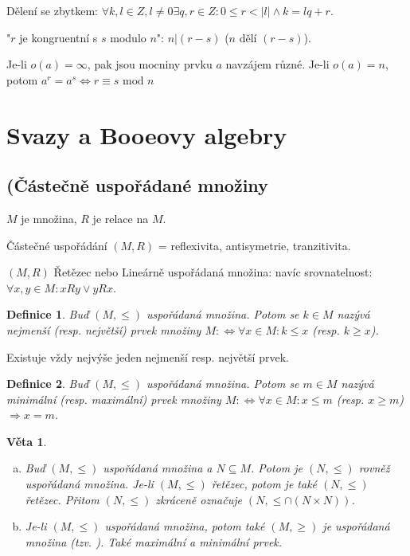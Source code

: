 \documentclass[a4paper, 11pt]{report}
\newtheorem{mydef}{Definice}[chapter]
\newtheorem{veta}{Věta}[chapter]
\begin{document}
Dělení se zbytkem: $\forall k,l \in Z, l \not= 0 \exists q,r \in Z: 0 \leq  r < |l| \land k = lq + r$.

"$r$ je kongruentní s $s$ modulo $n$": $n|(r - s)$ ($n$ dělí $(r-s)$).

Je-li $o(a) = \infty$, pak jsou mocniny prvku $a$ navzájem různé. Je-li $o(a) = n$, potom $a^r = a^s \Leftrightarrow r \equiv s \text{ mod } n$



\section{Svazy a Booeovy algebry}
\subsection{(Částečně uspořádané množiny}

$M$ je množina, $R$ je relace na $M$. 

Částečné uspořádání $(M, R)$ = reflexivita, antisymetrie, tranzitivita.

$(M, R)$ Řetězec nebo Lineárně uspořádaná množina: navíc srovnatelnost: $\forall x,y \in M: xRy \lor yRx$.

\begin{mydef}
Buď $(M, \leq)$ uspořádaná množina. Potom se $k \in M$ nazývá nejmenší (resp. největší) prvek množiny $M :\Leftrightarrow \forall x \in M: k \leq x$ (resp. $k \geq x$).
\end{mydef}

Existuje vždy nejvýše jeden nejmenší resp. největší prvek.

\begin{mydef}
Buď $(M, \leq)$ uspořádaná množina. Potom se $m \in M$ nazývá minimální (resp. maximální) prvek množiny $M :\Leftrightarrow \forall x \in M: x \leq m$ (resp. $x \geq m$) $\Rightarrow x = m$.
\end{mydef}

\begin{veta}
\begin{enumerate}[a)]
	\item Buď $(M, \leq)$ uspořádaná množina a $N \subseteq M$. Potom je $(N, \leq)$ rovněž uspořádaná množina. Je-li $(M, \leq)$ řetězec, potom je také $(N, \leq)$ řetězec. Přitom $(N, \leq)$ zkráceně označuje $(N, \leq \cap (N \times N))$.
	\item Je-li $(M, \leq)$ uspořádaná množina, potom také $(M, \geq)$ je uspořádaná množina (tzv. ). Také maximální a minimální prvek.
\end{enumerate}
\end{veta}
\end{document}
